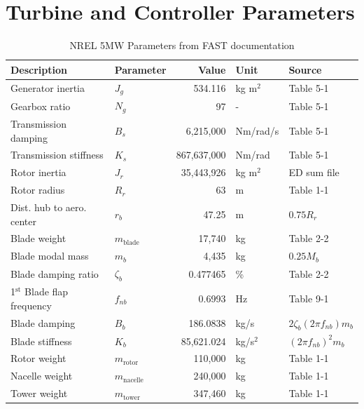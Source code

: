\chapter{Turbine and Controller Parameters} \label{appendixA}
\begin{table}[htbp]
    \centering
    \caption{NREL 5MW Parameters from FAST documentation \protect\cite{jonkman2009definition}}
    \label{table:1}
    \begin{tabular}{l l r l l}
        \toprule
        Description & Parameter & Value & Unit & Source \\
        \midrule
        Generator inertia & $J_{g}$ & 534.116 & kg m$^2$ & Table 5-1\\
        Gearbox ratio & $N_g$ & 97 & - & Table 5-1 \\
        Transmission damping & $B_s$ & 6,215,000 & Nm/rad/s & Table 5-1\\
        Transmission stiffness & $K_s$ & 867,637,000 & Nm/rad & Table 5-1\\
        Rotor inertia & $J_{r}$ & 35,443,926 & kg m$^2$ & ED sum file\\
        Rotor radius & $R_{r}$ & 63 & m & Table 1-1 \\
        Dist. hub to aero. center & $r_{b}$ & 47.25 & m & $0.75 R_{r}$ \\
        Blade weight & $m_{\text{blade}}$ & 17,740 & kg & Table 2-2\\ 
        Blade modal mass & $m_b$ & 4,435 & kg & $0.25 M_b$\\ 
        Blade damping ratio & $\zeta_b$ & 0.477465 & \% & Table 2-2 \\
        1$^{\text{st}}$ Blade flap frequency & $f_{nb}$ & 0.6993 & Hz & Table 9-1\\ 
        Blade damping & $B_{b}$ & 186.0838 & kg/s & $2\zeta_b (2 \pi f_{nb}) m_b$ \\ 
        Blade stiffness & $K_{b}$ & 85,621.024 & kg/s$^2$ & $(2 \pi f_{nb})^2 m_b$ \\
        Rotor weight & $m_{\text{rotor}}$ & 110,000 & kg & Table 1-1 \\ 
        Nacelle weight & $m_{\text{nacelle}}$ & 240,000 & kg & Table 1-1 \\     
        Tower weight & $m_{\text{tower}}$ & 347,460 & kg & Table 1-1 \\ 

\end{tabular}
\end{table}
